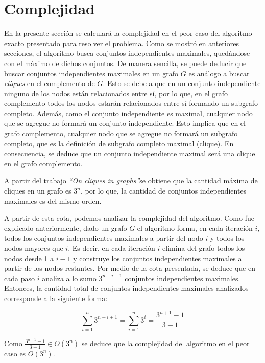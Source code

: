 \documentclass[a4paper,11pt] {article}
\begin{document}
\section*{Complejidad}

En la presente secci\'on se calcular\'a la complejidad en el peor caso del algoritmo exacto presentado para resolver el problema. Como se mostr\'o en anteriores secciones, el algoritmo busca conjuntos independientes maximales, qued\'andose con el m\'aximo de dichos conjuntos. De manera sencilla, se puede deducir que buscar conjuntos independientes maximales en un grafo $G$ es an\'alogo a buscar \textit{cliques} en el complemento de $G$. Esto se debe a que en un conjunto independiente ninguno de los nodos est\'an relacionados entre s\'i, por lo que, en el grafo complemento todos los nodos estar\'an relacionados entre s\'i formando un subgrafo completo. Adem\'as, como el conjunto independiente es maximal, cualquier nodo que se agregue no formar\'a un conjunto independiente. Esto implica que en el grafo complemento, cualquier nodo que se agregue no formar\'a un subgrafo completo, que es la definici\'on de subgrafo completo maximal (clique). En consecuencia, se deduce que un conjunto independiente maximal ser\'a una clique en el grafo complemento.

A partir del trabajo \textit{``On cliques in graphs''}\footnotemark[1] se obtiene que la cantidad m\'axima de cliques en un grafo es $3^{n}$, por lo que, la cantidad de conjuntos independientes maximales es del mismo orden. 

A partir de esta cota, podemos analizar la complejidad del algoritmo. Como fue explicado anteriormente, dado un grafo $G$ el algoritmo forma, en cada iteraci\'on $i$, todos los conjuntos independientes maximales a partir del nodo $i$ y todos los nodos mayores que $i$. Es decir, en cada iteraci\'on $i$ elimina del grafo todos los nodos desde 1 a $i-1$ y construye los conjuntos independientes maximales a partir de los nodos restantes. Por medio de la cota presentada, se deduce que en cada paso $i$ analiza a lo sumo $3^{n-i+1}$ conjuntos independientes maximales. Entonces, la cantidad total de conjuntos independientes maximales analizados corresponde a la siguiente forma:

\[\sum_{i = 1}^{n} 3^{n-i+1} = \sum_{i = 1}^{n} 3^{i} = \frac{3^{n+1}-1}{3-1}\]

Como $\frac{3^{n+1}-1}{3-1} \in O(3^{n})$ se deduce que la complejidad del algoritmo en el peor caso es $O(3^{n})$.

\end{document}
